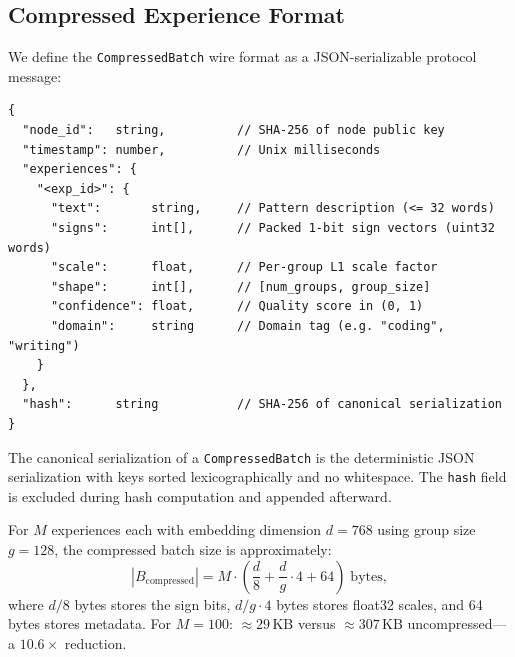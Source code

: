 \subsection{Compressed Experience Format}

We define the \texttt{CompressedBatch} wire format as a JSON-serializable
protocol message:

\begin{verbatim}
{
  "node_id":   string,          // SHA-256 of node public key
  "timestamp": number,          // Unix milliseconds
  "experiences": {
    "<exp_id>": {
      "text":       string,     // Pattern description (<= 32 words)
      "signs":      int[],      // Packed 1-bit sign vectors (uint32 words)
      "scale":      float,      // Per-group L1 scale factor
      "shape":      int[],      // [num_groups, group_size]
      "confidence": float,      // Quality score in (0, 1)
      "domain":     string      // Domain tag (e.g. "coding", "writing")
    }
  },
  "hash":      string           // SHA-256 of canonical serialization
}
\end{verbatim}

\begin{definition}
The canonical serialization of a \texttt{CompressedBatch} is the
deterministic JSON serialization with keys sorted lexicographically and
no whitespace. The \texttt{hash} field is excluded during hash computation
and appended afterward.
\end{definition}

For $M$ experiences each with embedding dimension $d = 768$ using group size
$g = 128$, the compressed batch size is approximately:
\begin{equation}
    |B_{\text{compressed}}| = M \cdot \left(\frac{d}{8} + \frac{d}{g} \cdot 4 + 64\right) \; \text{bytes},
\end{equation}
where $d/8$ bytes stores the sign bits, $d/g \cdot 4$ bytes stores float32
scales, and 64 bytes stores metadata. For $M = 100$: ${\approx}29\,\text{KB}$
versus ${\approx}307\,\text{KB}$ uncompressed---a $10.6\times$ reduction.

